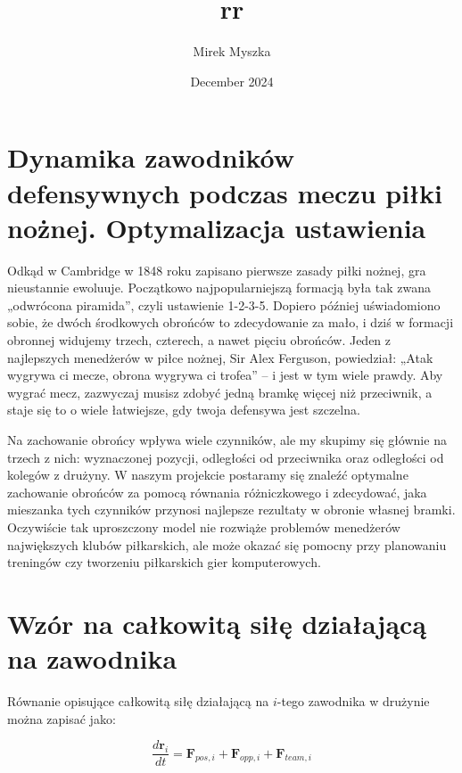 \documentclass{article}
\title{rr}
\author{Mirek Myszka}
\date{December 2024}
\begin{document}
\maketitle

\section*{Dynamika zawodników defensywnych podczas meczu piłki nożnej. Optymalizacja ustawienia} 

Odkąd w Cambridge w 1848 roku zapisano pierwsze zasady piłki nożnej, gra nieustannie ewoluuje. Początkowo najpopularniejszą formacją była tak zwana „odwrócona piramida”, czyli ustawienie 1-2-3-5. Dopiero później uświadomiono sobie, że dwóch środkowych obrońców to zdecydowanie za mało, i dziś w formacji obronnej widujemy trzech, czterech, a nawet pięciu obrońców. Jeden z najlepszych menedżerów w piłce nożnej, Sir Alex Ferguson, powiedział: „Atak wygrywa ci mecze, obrona wygrywa ci trofea” – i jest w tym wiele prawdy. Aby wygrać mecz, zazwyczaj musisz zdobyć jedną bramkę więcej niż przeciwnik, a staje się to o wiele łatwiejsze, gdy twoja defensywa jest szczelna.

Na zachowanie obrońcy wpływa wiele czynników, ale my skupimy się głównie na trzech z nich: wyznaczonej pozycji, odległości od przeciwnika oraz odległości od kolegów z drużyny. W naszym projekcie postaramy się znaleźć optymalne zachowanie obrońców za pomocą równania różniczkowego i zdecydować, jaka mieszanka tych czynników przynosi najlepsze rezultaty w obronie własnej bramki. Oczywiście tak uproszczony model nie rozwiąże problemów menedżerów największych klubów piłkarskich, ale może okazać się pomocny przy planowaniu treningów czy tworzeniu piłkarskich gier komputerowych.

\section*{Wzór na całkowitą siłę działającą na zawodnika}

Równanie opisujące całkowitą siłę działającą na $i$-tego zawodnika w drużynie można zapisać jako:

\begin{equation}
    \frac{d \textbf{r}_{i}}{dt}=\textbf{F}_{pos,i}+\textbf{F}_{opp,i}+\textbf{F}_{team,i}
\end{equation}
\end{document}
